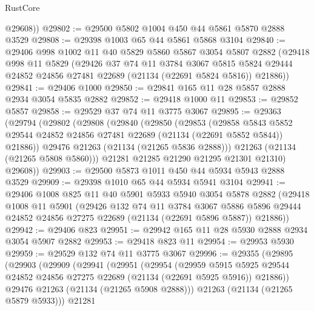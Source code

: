 \begin{lexlean}{RustCore}
\begin{coremodule}
        @29608))
@29802 := @29500 @5802 @1004 @450 @44 @5861 @5870 @2888 @3529
@29808 := @29398 @1003 @65 @44 @5861 @5868 @3104
@29840 := @29406
    @998
    @1002
    @11
    @40
    @5829
    @5860
    @5867
    @3054
    @5807
    @2882
    (@29418
      @998
      @11
      @5829
      (@29426
        @37
        @74
        @11
        @3784
        @3067
        @5815
        @5824
        @29444
        @24852
        @24856
        @27481
        @22689
        (@21134 (@22691 @5824 @5816))
        @21886))
@29841 := @29406 @1000
@29850 := @29841 @165 @11 @28 @5857 @2888 @2934 @3054 @5835 @2882
@29852 := @29418 @1000 @11
@29853 := @29852 @5857
@29858 := @29529 @37 @74 @11 @3775 @3067
@29895 := @29363
    (@29794
      (@29802
        (@29808
          (@29840
            (@29850
              (@29853
                (@29858
                  @5843
                  @5852
                  @29544
                  @24852
                  @24856
                  @27481
                  @22689
                  (@21134 (@22691 @5852 @5844))
                  @21886))
              @29476
              @21263
              (@21134 (@21265 @5836 @2888)))
            @21263
            (@21134 (@21265 @5808 @5860)))
          @21281
          @21285
          @21290
          @21295
          @21301
          @21310)
        @29608))
@29903 := @29500 @5873 @1011 @450 @44 @5934 @5943 @2888 @3529
@29909 := @29398 @1010 @65 @44 @5934 @5941 @3104
@29941 := @29406
    @1008
    @825
    @11
    @40
    @5901
    @5933
    @5940
    @3054
    @5878
    @2882
    (@29418
      @1008
      @11
      @5901
      (@29426
        @132
        @74
        @11
        @3784
        @3067
        @5886
        @5896
        @29444
        @24852
        @24856
        @27275
        @22689
        (@21134 (@22691 @5896 @5887))
        @21886))
@29942 := @29406 @823
@29951 := @29942 @165 @11 @28 @5930 @2888 @2934 @3054 @5907 @2882
@29953 := @29418 @823 @11
@29954 := @29953 @5930
@29959 := @29529 @132 @74 @11 @3775 @3067
@29996 := @29355
    (@29895
      (@29903
        (@29909
          (@29941
            (@29951
              (@29954
                (@29959
                  @5915
                  @5925
                  @29544
                  @24852
                  @24856
                  @27275
                  @22689
                  (@21134 (@22691 @5925 @5916))
                  @21886))
              @29476
              @21263
              (@21134 (@21265 @5908 @2888)))
            @21263
            (@21134 (@21265 @5879 @5933)))
          @21281

\end{coremodule}
\end{lexlean}

